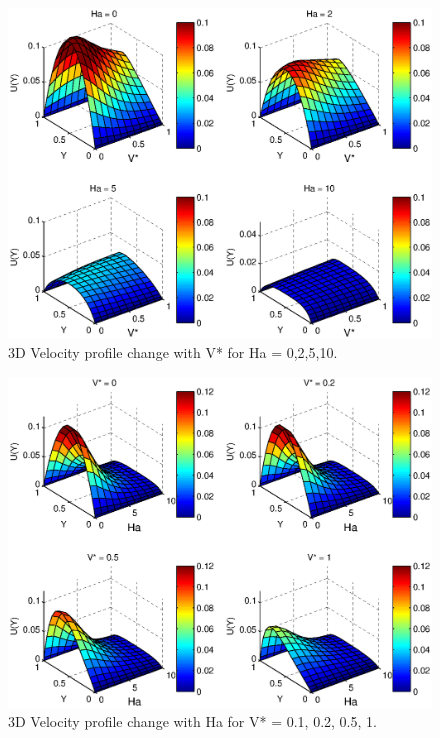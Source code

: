 \begin{figure}
  \includegraphics[scale=0.8]{figures/fig3.eps}
\vspace*{6mm}
\caption{3D Velocity profile change with V* for Ha = 0,2,5,10.}
\label{fig:3}       %
\end{figure}

\begin{figure}
  \includegraphics[scale=0.8]{figures/fig4.eps}
\vspace*{6mm}
\caption{3D Velocity profile change with Ha for V* = 0.1, 0.2, 0.5, 1.}
\label{fig:4}       %
\end{figure}


